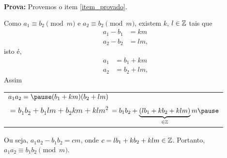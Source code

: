 \documentclass{beamer}
\begin{document}
    \begin{frame}
        \noindent\textbf{Prova: }
            Provemos o item \ref{item_provado}.\pause
            
            Como $a_{1}\equiv b_{2}\pmod{m}$ \pause e $a_{2}\equiv b_{2}\pmod{m}$, \pause existem $k$, $l \in \mathbb{Z}$ tais que\pause
            \begin{align*}
                a_1 - b_1 &= km\\
                a_2 - b_2 &= lm,
            \end{align*}\pause
            isto \'e,
            \begin{align*}
                a_1 &= b_1 + km\\
                a_2 &= b_2 + lm,
            \end{align*}\pause
            Assim
            \begin{center}
                \begin{tabular}{l}
                    $a_1a_2 = \pause (b_1 + km)(b_2 + lm)$ \\ \pause $= b_1b_2 + b_1lm + b_2km + klm^2 $ \pause $= b_1b_2 + \underbrace{(lb_{1}+kb_{2}+klm)}_{\in \z}m\pause$    
                \end{tabular}
            \end{center}\pause
            
            Ou seja, $a_1a_2 - b_1b_2 = cm$, \pause onde $c = lb_1 + kb_2 + klm \in \mathbb{Z}$. \pause Portanto, $a_1a_2 \equiv b_1b_2 \pmod{m}$.\hspace{.5cm} \qedsymbol\pause
    \end{frame}
\end{document}
